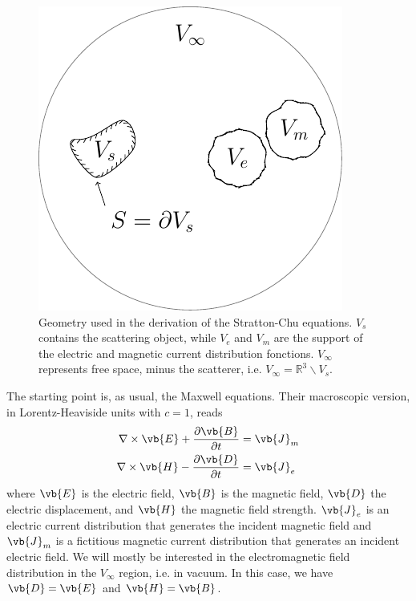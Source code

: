 \documentclass[11pt,SymmetricalJury]{inrsthesis/inrsthesis}
\begin{document}
  \begin{figure}
    \centering
    \includegraphics{figs/scatteringSystem.pdf}
    \caption[Geometry used in the derivation of the Stratton-Chu equations.]
            {Geometry used in the derivation of the Stratton-Chu equations.
             $V_s$ contains the scattering object, while $V_e$ and $V_m$ are the
             support of the electric and magnetic current distribution fonctions.
             $V_\infty$ represents free space, minus the scatterer, i.e.
             $V_\infty=\mathbb{R}^3\backslash V_s$.}
    \label{fig:sc.scatteringSystem}
  \end{figure}

The starting point is, as usual, the Maxwell equations. Their macroscopic version,
in Lorentz-Heaviside units with $c=1$, reads
  \begin{subequations}
  \begin{align}
    \nabla\times\vb{E} + \frac{\partial\vb{B}}{\partial t}  &= \vb{J}_m \\
    \nabla\times\vb{H} - \frac{\partial\vb{D}}{\partial t}  &= \vb{J}_e
  \end{align}
  \end{subequations}
where $\vb{E}$ is the electric field, $\vb{B}$ is the magnetic field,
$\vb{D}$ the electric displacement, and $\vb{H}$ the magnetic field strength.
$\vb{J}_e$ is an electric current distribution that generates the incident
magnetic field and $\vb{J}_m$ is a fictitious magnetic current distribution
that generates an incident electric field. We will mostly be interested
in the electromagnetic field distribution in the $V_\infty$ region, i.e.
in vacuum. In this case, we have $\vb{D}=\vb{E}$ and $\vb{H}=\vb{B}$.
\end{document}
